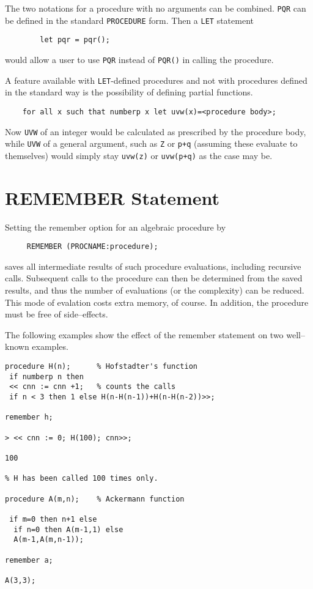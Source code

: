 \documentclass[11pt,letterpaper]{book}
\makeatletter
\newcommand{\underscore}{\_}
\newcommand{\ttindex}[1]{{\renewcommand{\_}{\protect\underscore}%
                          \index{#1@{\tt #1}}}}
\makeatother
\begin{document}
The two notations for a procedure with no arguments can be combined. {\tt PQR}
can be defined in the standard {\tt PROCEDURE} form. Then a {\tt LET}
statement
{\small\begin{verbatim}
        let pqr = pqr();
\end{verbatim}}
would allow a user to use {\tt PQR} instead of {\tt PQR()} in calling the
procedure.

A feature available with {\tt LET}-defined procedures and not with procedures
defined in the standard way is the possibility of defining partial
functions.
{\small\begin{verbatim}
    for all x such that numberp x let uvw(x)=<procedure body>;
\end{verbatim}}
Now {\tt UVW} of an integer would be calculated as prescribed by the procedure
body, while {\tt UVW} of a general argument, such as {\tt Z} or {\tt p+q}
(assuming these evaluate to themselves) would simply stay {\tt uvw(z)}
or {\tt uvw(p+q)} as the case may be.

\section{REMEMBER Statement}\ttindex{REMEMBER}

Setting the remember option for an algebraic procedure by
{\small\begin{verbatim}
     REMEMBER (PROCNAME:procedure);
\end{verbatim}}
saves all intermediate results of such procedure evaluations, including
recursive calls.  Subsequent calls to the procedure can then be determined
from the saved results, and thus the number of evaluations (or the
complexity) can be reduced.  This mode of evalation costs extra memory, of
course.  In addition, the procedure must be free of side--effects.

The following examples show the effect of the remember statement
on two well--known examples.

\begin{samepage}
{\small\begin{verbatim}
procedure H(n);      % Hofstadter's function
 if numberp n then
 << cnn := cnn +1;   % counts the calls
 if n < 3 then 1 else H(n-H(n-1))+H(n-H(n-2))>>;

remember h;

> << cnn := 0; H(100); cnn>>;

100

% H has been called 100 times only.

procedure A(m,n);    % Ackermann function

 if m=0 then n+1 else
  if n=0 then A(m-1,1) else
  A(m-1,A(m,n-1));

remember a;

A(3,3);

\end{verbatim}}
\end{samepage}
\end{document}
